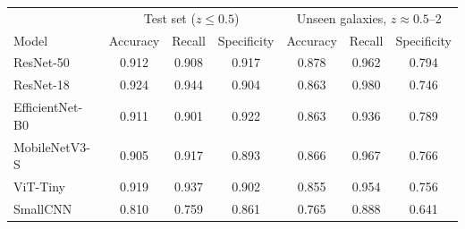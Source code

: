 \begin{tabular}{lcccccc}
\hline
 & \multicolumn{3}{c}{Test set ($z\leq0.5$)} & \multicolumn{3}{c}{Unseen galaxies, $z\approx0.5$--2} \\
Model & Accuracy & Recall & Specificity & Accuracy & Recall & Specificity \\
\hline
ResNet-50 & 0.912 & 0.908 & 0.917 & 0.878 & 0.962 & 0.794 \\
ResNet-18 & 0.924 & 0.944 & 0.904 & 0.863 & 0.980 & 0.746 \\
EfficientNet-B0 & 0.911 & 0.901 & 0.922 & 0.863 & 0.936 & 0.789 \\
MobileNetV3-S & 0.905 & 0.917 & 0.893 & 0.866 & 0.967 & 0.766 \\
ViT-Tiny & 0.919 & 0.937 & 0.902 & 0.855 & 0.954 & 0.756 \\
SmallCNN & 0.810 & 0.759 & 0.861 & 0.765 & 0.888 & 0.641 \\
\hline
\end{tabular}